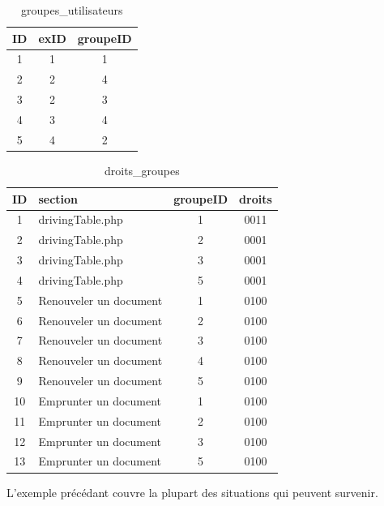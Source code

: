 \documentclass[letter, 10pt]{report}
\begin{document}
\begin{table}[h!]
	\caption{groupes\_utilisateurs}
	\begin{center}
		\begin{tabular}{|c|c|c|}
			\hline
			ID & exID & groupeID \\
			\hline
			1  & 1    & 1 \\
			2  & 2    & 4 \\
			3  & 2    & 3 \\
			4  & 3    & 4 \\
			5  & 4    & 2 \\
			\hline
		\end{tabular}
	\end{center}
\end{table}

\begin{table}[h!]
	\caption{droits\_groupes}
	\begin{center}
		\begin{tabular}{|c|l|c|c|}
			\hline
			ID & section                & groupeID & droits \\
			\hline
			1  & drivingTable.php       & 1        & 0011 \\
			2  & drivingTable.php       & 2        & 0001 \\
			3  & drivingTable.php       & 3        & 0001 \\
			4  & drivingTable.php       & 5        & 0001 \\
			5  & Renouveler un document & 1        & 0100 \\
			6  & Renouveler un document & 2        & 0100 \\
			7  & Renouveler un document & 3        & 0100 \\
			8  & Renouveler un document & 4        & 0100 \\
			9  & Renouveler un document & 5        & 0100 \\
			10 & Emprunter un document  & 1        & 0100 \\
			11 & Emprunter un document  & 2        & 0100 \\
			12 & Emprunter un document  & 3        & 0100 \\
			13 & Emprunter un document  & 5        & 0100 \\
			\hline
		\end{tabular}
	\end{center}
\end{table}

L'exemple précédant couvre la plupart des situations qui peuvent survenir.
\end{document}
